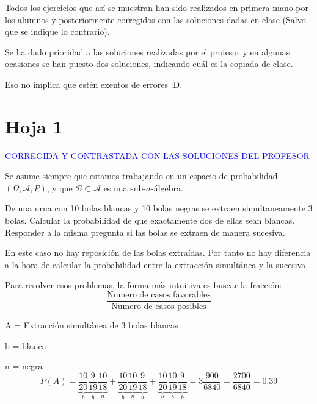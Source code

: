 %
%
%


Todos los ejercicios que así se muestran han sido realizados en primera mano por los alumnos y posteriormente corregidos con las soluciones dadas en clase (Salvo que se indique lo contrario).

Se ha dado prioridad a las soluciones realizadas por el profesor y en algunas ocasiones se han puesto dos soluciones, indicando cuál es la copiada de clase.

Eso no implica que estén exentos de errores :D.

\section{Hoja 1}

\textcolor{blue}{CORREGIDA Y CONTRASTADA CON LAS SOLUCIONES DEL PROFESOR}

Se asume siempre que estamos trabajando en un espacio de probabilidad $(\Omega, \mathcal{A}, P)$, y que  $\mathcal{B}\subset \mathcal{A}$ es una sub-$\sigma$-\'algebra.

\begin{problem}[1]De una urna con 10 bolas blancas y 10 bolas negras se extraen simultaneamente 3 bolas. 
Calcular la probabilidad de que exactamente dos de ellas sean blancas. Responder a la misma
pregunta si las bolas se extraen de manera sucesiva.
\solution

\begin{expla}
En este caso no hay reposición de las bolas extraídas. Por tanto no hay diferencia a la hora de calcular la probabilidad entre la extracción simultánea y la sucesiva.

Para resolver esos problemas, la forma más intuitiva es buscar la fracción:
\[
\frac{\text{Numero de casos favorables}}{\text{Numero de casos posibles}}
\]
\end{expla}
A = Extracción simultánea de 3 bolas blancas

b = blanca

n = negra
\[
P(A)=\underbrace{\frac{10}{20}}_{b}\underbrace{\frac{9}{19}}_{b}\underbrace{\frac{10}{18}}_{n}+\underbrace{\frac{10}{20}}_{b}\underbrace{\frac{10}{19}}_{n}\underbrace{\frac{9}{18}}_{b}+\underbrace{\frac{10}{20}}_{n}\underbrace{\frac{10}{19}}_{b}\underbrace{\frac{9}{18}}_{b} = 3\frac{900}{6840}=\frac{2700}{6840}=0.39
\]

\end{problem}


